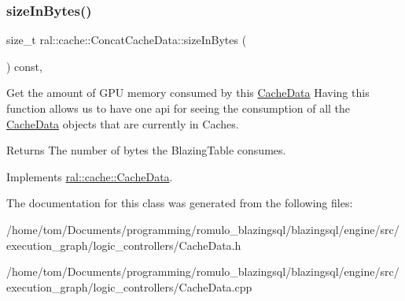 \mbox{\label{classral_1_1cache_1_1ConcatCacheData_a25914d06c36e4a1748dc9479adc5ccd8}} 
\subsubsection{\texorpdfstring{size\+In\+Bytes()}{sizeInBytes()}}
{\footnotesize\ttfamily size\+\_\+t ral\+::cache\+::\+Concat\+Cache\+Data\+::size\+In\+Bytes (\begin{DoxyParamCaption}{ }\end{DoxyParamCaption}) const\hspace{0.3cm}{\ttfamily [override]}, {\ttfamily [virtual]}}

Get the amount of G\+PU memory consumed by this \hyperlink{classral_1_1cache_1_1CacheData}{Cache\+Data} Having this function allows us to have one api for seeing the consumption of all the \hyperlink{classral_1_1cache_1_1CacheData}{Cache\+Data} objects that are currently in Caches. \begin{DoxyReturn}{Returns}
The number of bytes the Blazing\+Table consumes. 
\end{DoxyReturn}


Implements \hyperlink{classral_1_1cache_1_1CacheData_aaad8a726296574845f01f9380dcee40d}{ral\+::cache\+::\+Cache\+Data}.



The documentation for this class was generated from the following files\+:\begin{DoxyCompactItemize}
\item 
/home/tom/\+Documents/programming/romulo\+\_\+blazingsql/blazingsql/engine/src/execution\+\_\+graph/logic\+\_\+controllers/Cache\+Data.\+h\item 
/home/tom/\+Documents/programming/romulo\+\_\+blazingsql/blazingsql/engine/src/execution\+\_\+graph/logic\+\_\+controllers/Cache\+Data.\+cpp\end{DoxyCompactItemize}
